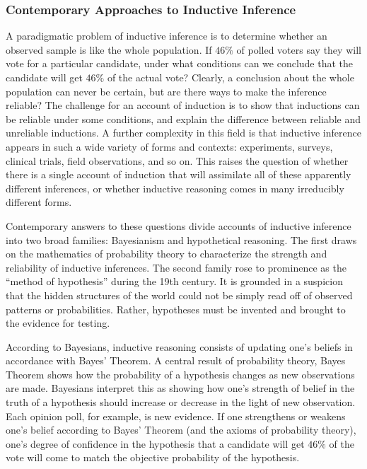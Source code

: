 \documentclass{article}[11pt]
\begin{document}

\subsubsection*{Contemporary Approaches to Inductive Inference}

A paradigmatic problem of inductive inference is to determine whether an observed sample is like the whole population.  If $46\%$ of polled voters say they will vote for a particular candidate, under what conditions can we conclude that the candidate will get $46\%$ of the actual vote?  Clearly, a conclusion about the whole population can never be certain, but are there ways to make the inference reliable? The challenge for an account of induction is to show that inductions can be reliable under some conditions, and explain the difference between reliable and unreliable inductions.  A further complexity in this field is that inductive inference appears in such a wide variety of forms and contexts: experiments, surveys, clinical trials, field observations, and so on.  This raises the question of whether there is a single account of induction that will assimilate all of these apparently different inferences, or whether inductive reasoning comes in many irreducibly different forms.


Contemporary answers to these questions divide accounts of inductive inference into two broad families:  Bayesianism and hypothetical reasoning.  The first draws on the mathematics of probability theory to characterize the strength and reliability of inductive inferences.  The second family rose to prominence as the ``method of hypothesis'' during the 19th century.  It is grounded in a suspicion that the hidden structures of the world could not be simply read off of observed patterns or probabilities.  Rather, hypotheses must be invented and brought to the evidence for testing.

According to Bayesians, inductive reasoning consists of updating one's beliefs in accordance with Bayes' Theorem.  A central result of probability theory, Bayes Theorem shows how the probability of a hypothesis changes as new observations are made.  Bayesians interpret this as showing how one's strength of belief in the truth of a hypothesis should increase or decrease in the light of new observation.  Each opinion poll, for example, is new evidence.  If one strengthens or weakens one's belief according to Bayes' Theorem (and the axioms of probability theory), one's degree of confidence in the hypothesis that a candidate will get $46\%$ of the vote will come to match the objective probability of the hypothesis.
\end{document}
